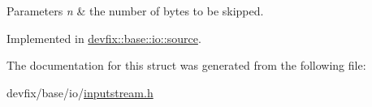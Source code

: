 \begin{DoxyParams}{Parameters}
{\em n} & the number of bytes to be skipped. \\
\hline
\end{DoxyParams}


Implemented in \hyperlink{structdevfix_1_1base_1_1io_1_1source_a21cb579307589cbc6f9e02d64c66f4b2}{devfix\+::base\+::io\+::source}.



The documentation for this struct was generated from the following file\+:\begin{DoxyCompactItemize}
\item 
devfix/base/io/\hyperlink{inputstream_8h}{inputstream.\+h}\end{DoxyCompactItemize}
